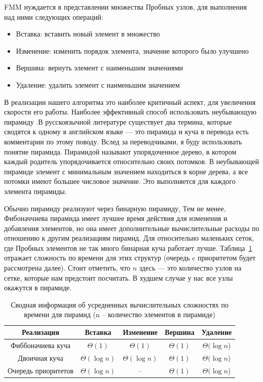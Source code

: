 FMM нуждается в представлении множества Пробных узлов, для
выполнения над ними следующих операций:
\begin{itemize}
\item Вставка: вставить новый элемент в множество
\item Изменение: изменить порядок элемента, значение которого было
  улучшено
\item Вершина: вернуть элемент с наименьшим значениями
\item Удаление: удалить элемент с наименьшим значением 
\end{itemize}
В реализации нашего алгоритма это наиболее критичный аспект, для
увеличения скорости его работы. Наиболее эффективный способ
использовать неубывающую пирамиду \cite{TK2017}.В русскоязычной
литературе существует два термина, которые сводятся к одному в
английском языке --- это пирамида и куча в перевода \cite{TK2017} есть
комментарии по этому поводу. Вслед за переводчиками, я буду
использовать понятие пирамида. Пирамидой называют упорядоченное дерево,
в котором каждый родитель упорядочивается относительно своих потомков. В
неубывающей пирамиде элемент с минимальным значением находиться в
корне дерева, а все потомки имеют большее числовое значение. Это
выполняется для каждого элемента пирамиды.

Обычно пирамиду реализуют через бинарную пирамиду, Тем не менее,
Фибоначчиева пирамида \cite{F1987} имеет лучшее время действия для
изменения и добавления элементов, но она имеет дополнительные
вычислительные расходы по отношению к другим реализациям пирамид. Для
относительно маленьких сеток, где Пробных элементов не так много
бинарная куча работает лучше. Таблица~\ref{tab:perf} отражает
сложность по времени для этих структур (очередь c приоритетом будет
рассмотрена далее). Стоит отметить, что $n$ здесь --- это количество
узлов на сетке, которые нам предстоит посчитать. В худшем случае у нас
все узлы окажутся в пирамиде.

\begin{table}
  \centering
  \caption{Сводная информация об усредненных вычислительных
    сложностях по времени для пирамид (n -- количество элементов в
    пирамиде)}
  \label{tab:perf}
  \begin{tabular}{|*{5}{c|}}
    \hline
Реализация & Вставка & Изменение & Вершина & Удаление\\[0.3cm]\hline
Фиббоначиева куча & $\Theta(1)$ & $\Theta(1)$&$\Theta(1)$&$\Theta(\log n$) \\\hline
Двоичная куча & $\Theta(\log n)$ & $\Theta(\log n)$&$\Theta(1)$&$\Theta(\log n$) \\\hline
Очередь приоритетов & $\Theta(\log n)$ & -- &$\Theta(1)$&$\Theta(\log n$) \\\hline
    
  \end{tabular}
\end{table}

